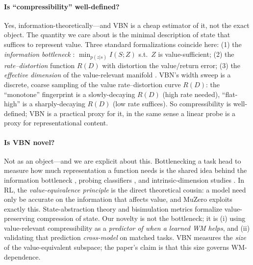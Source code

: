 \documentclass[letterpaper]{article}
\begin{document}
\paragraph{Is ``compressibility'' well-defined?}
Yes, information-theoretically---and VBN is a cheap estimator of it, not the
exact object. The quantity we care about is the minimal description of state
that suffices to represent value. Three standard formalizations coincide here:
(1) the \emph{information bottleneck} \cite{tishby1999ib,tishby2015dl}:
$\min_{p(z|s)} I(S;Z)$ s.t.\ $Z$ is value-sufficient; (2) the
\emph{rate--distortion} function $R(D)$ with distortion the value/return
error; (3) the \emph{effective dimension} of the value-relevant manifold
\cite{li2018intrinsic}. VBN's width sweep is a discrete, coarse sampling of
the value rate--distortion curve $R(D)$: the ``monotone'' fingerprint is a
slowly-decaying $R(D)$ (high rate needed), ``flat-high'' is a sharply-decaying
$R(D)$ (low rate suffices). So compressibility is well-defined; VBN is a
practical proxy for it, in the same sense a linear probe
\cite{alain2016probes} is a proxy for representational content.

\paragraph{Is VBN novel?}
Not as an object---and we are explicit about this. Bottlenecking a task head
to measure how much representation a function needs is the shared idea behind
the information bottleneck \cite{tishby1999ib}, probing classifiers
\cite{alain2016probes}, and intrinsic-dimension studies
\cite{li2018intrinsic}. In RL, the \emph{value-equivalence principle}
\cite{grimm2020value} is the direct theoretical cousin: a model need only be
accurate on the information that affects value, and MuZero
\cite{schrittwieser2020muzero} exploits exactly this. State-abstraction theory
\cite{li2006abstraction} and bisimulation metrics \cite{zhang2021dbc} formalize
value-preserving compression of state. Our novelty is not the bottleneck; it
is (i) using value-relevant compressibility as a \emph{predictor of when a
learned WM helps}, and (ii) validating that prediction \emph{cross-model} on
matched tasks. VBN measures the \emph{size} of the value-equivalent subspace;
the paper's claim is that this size governs WM-dependence.
\end{document}
